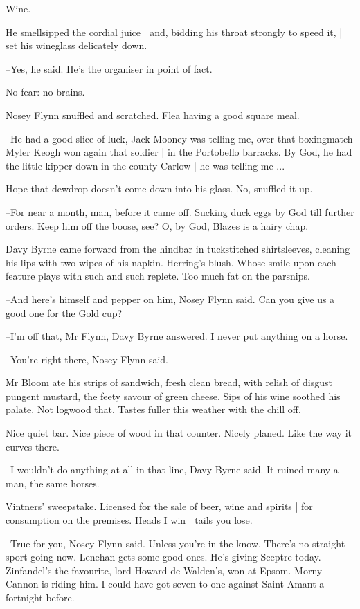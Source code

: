 Wine.

He smellsipped the cordial juice |
and, bidding his throat strongly to speed it, |
set his wineglass delicately down.

--Yes,
he said.
He's the organiser in point of fact.

No fear:
no brains.

Nosey Flynn snuffled and scratched.
Flea having a good square meal.

--He had a good slice of luck,
Jack Mooney was telling me,
over that boxingmatch Myler Keogh won again that soldier |
in the Portobello barracks.
By God,
he had the little kipper down in the county Carlow |
he was telling me ...

Hope that dewdrop doesn't come down into his glass.
No,
snuffled it up.

--For near a month, man,
before it came off.
Sucking duck eggs by God till further orders.
Keep him off the boose, see?
O, by God,
Blazes is a hairy chap.

Davy Byrne came forward from the hindbar in tuckstitched shirtsleeves,
cleaning his lips with two wipes of his napkin.
Herring's blush.
Whose smile upon each feature plays with such and such replete.
Too much fat on the parsnips.

--And here's himself and pepper on him,
Nosey Flynn said.
Can you give us a good one for the Gold cup?

--I'm off that, Mr Flynn,
Davy Byrne answered.
I never put anything on a horse.

--You're right there,
Nosey Flynn said.

Mr Bloom ate his strips of sandwich,
fresh clean bread,
with relish of disgust pungent mustard,
the feety savour of green cheese.
Sips of his wine soothed his palate.
Not logwood that.
Tastes fuller this weather with the chill off.

Nice quiet bar.
Nice piece of wood in that counter.
Nicely planed.
Like the way it curves there.

--I wouldn't do anything at all in that line,
Davy Byrne said.
It ruined many a man,
the same horses.

Vintners' sweepstake.
Licensed for the sale of beer, wine and spirits |
for consumption on the premises.
Heads I win |
tails you lose.

--True for you,
Nosey Flynn said.
Unless you're in the know.
There's no straight sport going now.
Lenehan gets some good ones.
He's giving Sceptre today.
Zinfandel's the favourite,
lord Howard de Walden's,
won at Epsom.
Morny Cannon is riding him.
I could have got seven to one against Saint Amant a fortnight before.

